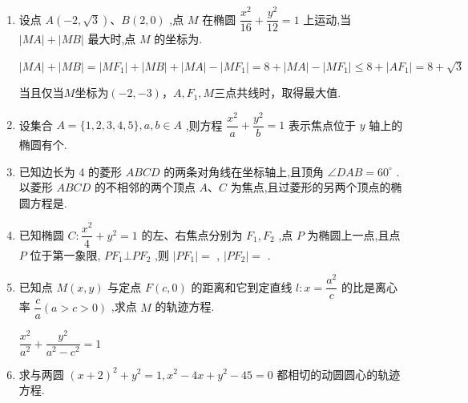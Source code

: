 \begin{enumerate}
    \item 设点 $A\left( {-2,\sqrt{3}}\right) \text{、}B\left( {2,0}\right)$ ,点 $M$ 在椭圆 $\dfrac{{x}^{2}}{16} + \dfrac{{y}^{2}}{12} = 1$ 上运动,当 $\left| {MA}\right|  + \left| {MB}\right|$ 最大时,点 $M$ 的坐标为.
    \begin{jieda}
        $|MA|+|MB| = |MF_1|+|MB|+|MA|-|MF_1| = 8+|MA|-|MF_1| \leq 8 + |AF_1| = 8+\sqrt{3}$

        当且仅当$M$坐标为$(-2,-3)$，$A,F_1,M$三点共线时，取得最大值.
    \end{jieda}

    \item 设集合 $A = \{ 1,2,3,4,5\} ,a,b \in  A$ ,则方程 $\dfrac{{x}^{2}}{a} + \dfrac{{y}^{2}}{b} = 1$ 表示焦点位于 $y$ 轴上的椭圆有个.


    \item 已知边长为 4 的菱形 ${ABCD}$ 的两条对角线在坐标轴上,且顶角 $\angle {DAB} = {60}^{ \circ  }$ . 以菱形 ${ABCD}$ 的不相邻的两个顶点 $A\text{、}C$ 为焦点,且过菱形的另两个顶点的椭圆方程是.

    \item 已知椭圆 $C : \dfrac{{x}^{2}}{4} + {y}^{2} = 1$ 的左、右焦点分别为 ${F}_{1},{F}_{2}$ ,点 $P$ 为椭圆上一点,且点 $P$ 位于第一象限, $P{F}_{1} \bot  P{F}_{2}$ ,则 $\left| {P{F}_{1}}\right|  =$ , $\left| {P{F}_{2}}\right|  =$ .

    \item 已知点 ${M}\left( {x,y}\right)$ 与定点 ${F}\left( {c,0}\right)$ 的距离和它到定直线 $l : x = \dfrac{{a}^{2}}{c}$ 的比是离心率 $\dfrac{c}{a}\left( {a > c > 0}\right)$ ,求点 ${M}$ 的轨迹方程.
    \begin{jieda}
        $\dfrac{x^2}{a^2}+\dfrac{y^2}{a^2-c^2}=1$
    \end{jieda}
    

    \item 求与两圆 ${\left( x + 2\right) }^{2} + {y}^{2} = 1,{x}^{2} - {4x} + {y}^{2} - {45} = 0$ 都相切的动圆圆心的轨迹方程.
    \begin{jieda}
    \end{jieda}


\end{enumerate}
